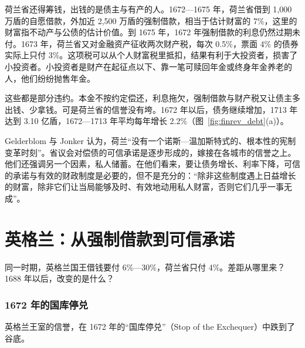 荷兰省还得筹钱，出钱的是债主与有产的人。1672—1675 年，荷兰省借到 1,000 万盾的自愿借款，外加近 2,500 万盾的强制借款，相当于估计财富的 7\%，这里的财富指不动产与公债的估计价值。到 1675 年，1672 年强制借款的利息仍然过期未付\cite{gj2011}。1673 年，荷兰省又对金融资产征收两次财产税，每次 0.5\%，票面 4\% 的债券实际上只付 3\%\cite{gj2011}。这项税可以从个人财富税里抵扣，结果有利于大投资者，损害了小投资者。小投资者是财产在起征点以下、靠一笔可赎回年金或终身年金养老的人，他们纷纷抛售年金\cite{gj2011}。

这些都是部分违约。本金不按约定偿还，利息拖欠，强制借款与财产税又让债主多出钱、少拿钱。可是荷兰省的信誉没有垮。1672 年以后，债务继续增加，1713 年达到 3.10 亿盾，1672—1713 年平均每年增长 2.2\%（图~\ref{fig:finrev_debt}(a)）。

Gelderblom 与 Jonker 认为，荷兰“没有一个诺斯—温加斯特式的、根本性的宪制变革时刻”。省议会对偿债的可信承诺是逐步形成的，嫁接在各城市的信誉之上\cite{gj2011}。他们还强调另一个因素，私人储蓄。在他们看来，要让债务增长、利率下降，可信的承诺与有效的财政制度是必要的，但不是充分的：“除非这些制度遇上日益增长的财富，除非它们让当局能够及时、有效地动用私人财富，否则它们几乎一事无成”\cite{gj2011}。

\section{英格兰：从强制借款到可信承诺}\label{sec:finrev-england}

同一时期，英格兰国王借钱要付 6\%—30\%，荷兰省只付 4\%。差距从哪里来？1688 年以后，改变的是什么？

\subsubsection{1672 年的国库停兑}
英格兰王室的信誉，在 1672 年的“国库停兑”（Stop of the Exchequer）中跌到了谷底。

